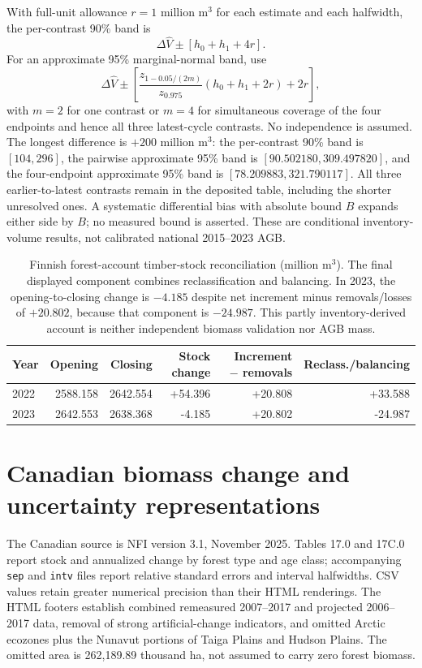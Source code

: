 With full-unit allowance $r=1$ million m$^3$ for each estimate and each halfwidth, the per-contrast 90\% band is
\[
\Delta\widehat V\pm[h_0+h_1+4r].
\]
For an approximate 95\% marginal-normal band, use
\[
\Delta\widehat V\pm\left[\frac{z_{1-0.05/(2m)}}{z_{0.975}}(h_0+h_1+2r)+2r\right],
\]
with $m=2$ for one contrast or $m=4$ for simultaneous coverage of the four endpoints and hence all three latest-cycle contrasts. No independence is assumed. The longest difference is $+200$ million m$^3$: the per-contrast 90\% band is $[104,296]$, the pairwise approximate 95\% band is $[90.502180,309.497820]$, and the four-endpoint approximate 95\% band is $[78.209883,321.790117]$. All three earlier-to-latest contrasts remain in the deposited table, including the shorter unresolved ones. A systematic differential bias with absolute bound $B$ expands either side by $B$; no measured bound is asserted. These are conditional inventory-volume results, not calibrated national 2015--2023 AGB.

\begin{table}[htbp]
\centering\small
\caption{Finnish forest-account timber-stock reconciliation (million m$^3$). The final displayed component combines reclassification and balancing. In 2023, the opening-to-closing change is $-4.185$ despite net increment minus removals/losses of $+20.802$, because that component is $-24.987$. This partly inventory-derived account is neither independent biomass validation nor AGB mass.}\label{tab:SI_FIN_stock_flow}
\begin{tabularx}{\textwidth}{lrrrrr}\toprule
Year & Opening & Closing & Stock change & Increment $-$ removals & Reclass./balancing\\\midrule
2022 & 2588.158 & 2642.554 & +54.396 & +20.808 & +33.588\\
2023 & 2642.553 & 2638.368 & -4.185 & +20.802 & -24.987\\
\bottomrule\end{tabularx}
\end{table}

\section{Canadian biomass change and uncertainty representations}
The Canadian source is NFI version 3.1, November 2025. Tables 17.0 and 17C.0 report stock and annualized change by forest type and age class; accompanying \texttt{sep} and \texttt{intv} files report relative standard errors and interval halfwidths. CSV values retain greater numerical precision than their HTML renderings. The HTML footers establish combined remeasured 2007--2017 and projected 2006--2017 data, removal of strong artificial-change indicators, and omitted Arctic ecozones plus the Nunavut portions of Taiga Plains and Hudson Plains. The omitted area is 262,189.89 thousand ha, not assumed to carry zero forest biomass.

